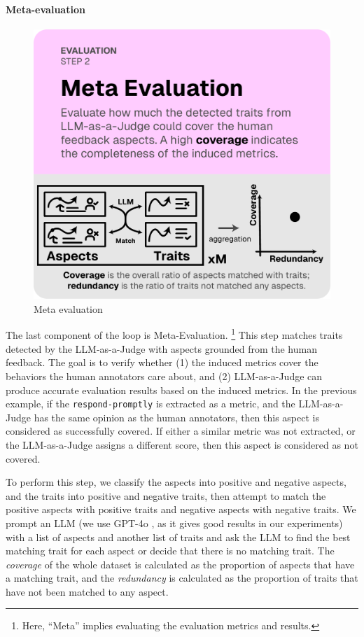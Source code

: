 \paragraph{Meta-evaluation}
\begin{figure}
  \vspace{-15pt}
  \includegraphics[width=\linewidth]{figs/autolibra_step_4.pdf}
  \vspace{-10pt}
  \caption{\small Meta evaluation}
  \label{fig:meta_evaluation}
\end{figure}
The last component of the loop is Meta-Evaluation. \footnote{Here, ``Meta'' implies evaluating the evaluation metrics and results.}
This step matches traits detected by the LLM-as-a-Judge with aspects
grounded from the human feedback. The goal is to verify whether (1) the induced metrics cover the behaviors the human annotators care about, and (2) LLM-as-a-Judge can produce
accurate evaluation results based on the induced metrics. In the previous example,
if the \texttt{respond-promptly} is extracted as a metric, and the LLM-as-a-Judge
has the same opinion as the human annotators, then this aspect is considered as successfully covered.
If either a similar metric was not extracted, or the LLM-as-a-Judge assigns a different score,
then this aspect is considered as not covered.

To perform this step, we classify the aspects into positive and negative aspects, and the
traits into positive and negative traits, then attempt to match the positive aspects with positive traits
and negative aspects with negative traits. 
We prompt an LLM (we use GPT-4o \citep{openai2024gpt4ocard},
as it gives good results in our experiments) with a list of aspects and another list of traits
and ask the LLM to find the best matching trait for each aspect or decide that there is no matching trait.
The \emph{coverage} of the whole dataset is calculated as the proportion of aspects that have a matching trait,
and the \emph{redundancy} is calculated as the proportion of traits that have not been matched to any aspect.

